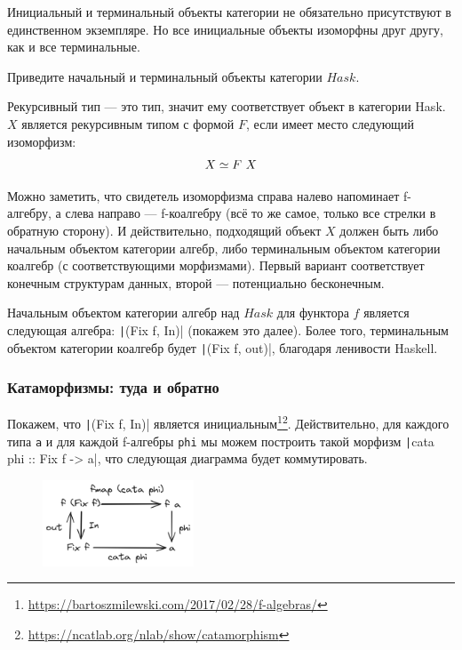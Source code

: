 Инициальный и терминальный объекты категории не обязательно присутствуют в единственном экземпляре.
Но все инициальные объекты изоморфны друг другу, как и все терминальные.

\begin{task}
    Приведите начальный и терминальный объекты категории $Hask$.
\end{task}

Рекурсивный тип --- это тип, значит ему соответствует объект в категории Hask.
$X$ является рекурсивным типом с формой $F$, если имеет место следующий изоморфизм:
\[X \simeq F~ X\]

Можно заметить, что свидетель изоморфизма справа налево напоминает f-алгебру, а слева направо --- f-коалгебру (всё то же самое, только все стрелки в обратную сторону).
И действительно, подходящий объект $X$ должен быть либо начальным объектом категории алгебр, либо терминальным объектом категории коалгебр (с соответствующими морфизмами).
Первый вариант соответствует конечным структурам данных, второй --- потенциально бесконечным.

Начальным объектом категории алгебр над $Hask$ для функтора $f$ является следующая алгебра: \texttt|(Fix f, In)| (покажем это далее).
Более того, терминальным объектом категории коалгебр будет \texttt|(Fix f, out)|, благодаря ленивости Haskell.


\subsubsection{Катаморфизмы: туда и обратно}

Покажем, что \texttt|(Fix f, In)| является инициальным\footnote{\url{https://bartoszmilewski.com/2017/02/28/f-algebras/}}\footnote{\url{https://ncatlab.org/nlab/show/catamorphism}}.
Действительно, для каждого типа \texttt{a} и для каждой f-алгебры \texttt{phi} мы можем построить такой морфизм \texttt|cata phi :: Fix f -> a|, что следующая диаграмма будет коммутировать.
\begin{figure}[h!]
    \centering
    \includegraphics[width=0.4\textwidth]{figs/cata}
\end{figure}

